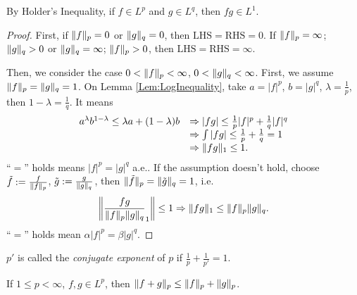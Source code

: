 \begin{rem}
    By Holder's Inequality, if $f\in L^{p}$ and $g\in L^{q}$, 
    then $fg\in L^{1}$.
\end{rem}
\begin{proof}
    First, if $\|f\|_{p}=0$ or $\|g\|_{q}=0$, 
    then $\text{LHS}=\text{RHS}=0$. If $\|f\|_{p}=\infty$; 
    $\|g\|_{q}>0$ 
    or $\|g\|_{q}=\infty$; $\|f\|_{p}>0$, then 
    $\text{LHS}=\text{RHS}=\infty$.

    Then, we consider the case $0<\|f\|_{p}<\infty$, 
    $0<\|g\|_{q}<\infty$. First, we assume 
    $\|f\|_{p}=\|g\|_{q}=1$. On Lemma 
    \ref{Lem:LogInequality}, take 
    $a=|f|^{p}$, $b=|g|^{q}$, $\lambda=\frac{1}{p}$, then 
    $1-\lambda=\frac{1}{q}$. It means 
    \begin{displaymath}
        \begin{array}{rl}
            a^{\lambda}b^{1-\lambda}\le\lambda a+(1-\lambda)b&
            \Rightarrow |fg|\le\frac{1}{p}|f|^{p}+\frac{1}{q}|f|^{q}\\
            &\Rightarrow\int|fg|\le\frac{1}{p}+\frac{1}{q}=1\\
            &\Rightarrow\|fg\|_{1}\le 1.
        \end{array}
    \end{displaymath}
    ``$=$'' holds means $|f|^{p}=|g|^{q}$ a.e.. 
    If the assumption doesn't hold, choose 
    $\tilde{f}:=\frac{f}{\|f\|_{p}}$, 
    $\tilde{g}:=\frac{g}{\|g\|_{q}}$, 
    then $\|\tilde{f}\|_{p}=\|\tilde{g}\|_{q}=1$, i.e. 
    \begin{displaymath}
        \left\|{\frac{fg}{\|f\|_p\|g\|_{q}}}_{1}\right\|
        \le 1
        \Rightarrow\|fg\|_{1}\le\|f\|_{p}\|g\|_{q}.
    \end{displaymath}
    ``$=$'' holds mean $\alpha|f|^{p}=\beta|g|^{q}$.
\end{proof}
\begin{ntn}
    $p'$ is called the \textit{conjugate exponent} of $p$ if 
    $\frac{1}{p}+\frac{1}{p'}=1$. 
\end{ntn}
\begin{thm}
    If $1\le p<\infty$, $f,g\in L^{p}$, then 
    $\|f+g\|_{p}\le\|f\|_{p}+\|g\|_{p}$.
\end{thm}
